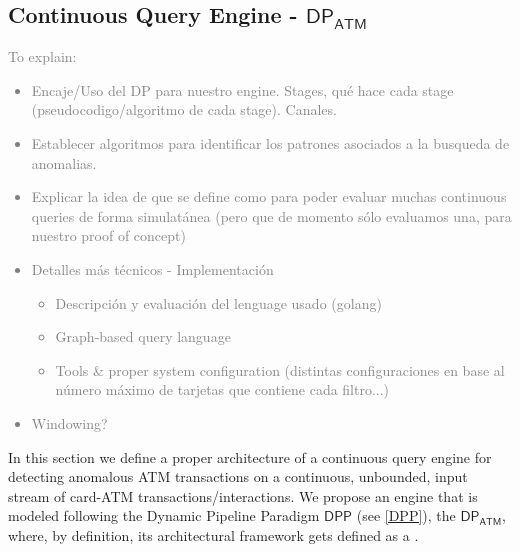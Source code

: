 \newpage

\subsection{Continuous Query Engine - $\mathsf{DP_{ATM}}$}\label{ContinuousQueryEngine}

\textcolor{gray}{To explain:
\begin{itemize}
    \item Encaje/Uso del DP para nuestro engine. Stages, qué hace cada stage (pseudocodigo/algoritmo de cada stage). Canales.
    \item Establecer algoritmos para identificar los patrones asociados a la busqueda de anomalias.
    \item Explicar la idea de que se define como para poder evaluar muchas continuous queries de forma simulatánea (pero que de momento sólo evaluamos una, para nuestro proof of concept)
    \item Detalles más técnicos - Implementación
    \begin{itemize}
        \item Descripción y evaluación del lenguage usado (golang)
        \item Graph-based query language
        \item Tools \& proper system configuration (distintas configuraciones en base al número máximo de tarjetas que contiene cada filtro...)
    \end{itemize}
    \item Windowing?
\end{itemize}
}

In this section we define a proper architecture of a continuous query engine for detecting anomalous ATM transactions on a continuous, unbounded, input stream of card-ATM transactions/interactions. We propose an engine that is modeled following the Dynamic Pipeline Paradigm $\mathsf{DPP}$ (see \ref{DPP}), the $\mathsf{DP_{ATM}}$, where, by definition, its architectural framework gets defined as a \DP.\\ 


